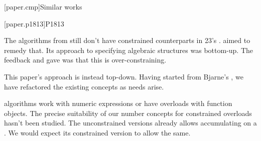 

[paper.cmp]{Similar works}

[paper.p1813]{P1813}

\pnum
The algorithms from  still don't have constrained counterparts in \Cpp{}23's .
 aimed to remedy that.
Its approach to specifying algebraic structures was bottom-up.
The feedback  and \hrefVI{} gave was that this is over-constraining.

\pnum
This paper's approach is instead top-down.
Having started from Bjarne's ,
we have refactored the existing concepts as needs arise.

\pnum
{} algorithms work with numeric expressions or have overloads with function objects.
The precise suitability of our number concepts for constrained overloads hasn't been studied.
The unconstrained versions  already allows accumulating on a .
We would expect its constrained version to allow the same.
